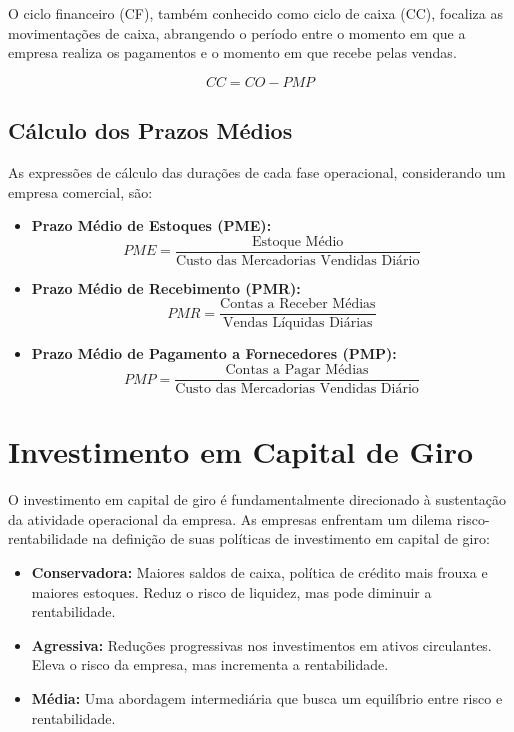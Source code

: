 \documentclass[
  a4paper,
]{book}
\providecommand{\tightlist}{%
  \setlength{\itemsep}{0pt}\setlength{\parskip}{0pt}}\usepackage{longtable,booktabs,array}
\begin{document}
O ciclo financeiro (CF), também conhecido como ciclo de caixa (CC),
focaliza as movimentações de caixa, abrangendo o período entre o momento
em que a empresa realiza os pagamentos e o momento em que recebe pelas
vendas.

\[CC = CO - PMP\]

\subsection{Cálculo dos Prazos
Médios}\label{cuxe1lculo-dos-prazos-muxe9dios}

As expressões de cálculo das durações de cada fase operacional,
considerando um empresa comercial, são:

\begin{itemize}
\tightlist
\item
  \textbf{Prazo Médio de Estoques (PME):}
  \[PME = \frac{\text{Estoque Médio}}{\text{Custo das Mercadorias Vendidas Diário}}\]
\item
  \textbf{Prazo Médio de Recebimento (PMR):}
  \[PMR = \frac{\text{Contas a Receber Médias}}{\text{Vendas Líquidas Diárias}}\]
\item
  \textbf{Prazo Médio de Pagamento a Fornecedores (PMP):}
  \[PMP = \frac{\text{Contas a Pagar Médias}}{\text{Custo das Mercadorias Vendidas Diário}}\]
\end{itemize}

\section{Investimento em Capital de
Giro}\label{investimento-em-capital-de-giro}

O investimento em capital de giro é fundamentalmente direcionado à
sustentação da atividade operacional da empresa. As empresas enfrentam
um dilema risco-rentabilidade na definição de suas políticas de
investimento em capital de giro:

\begin{itemize}
\tightlist
\item
  \textbf{Conservadora:} Maiores saldos de caixa, política de crédito
  mais frouxa e maiores estoques. Reduz o risco de liquidez, mas pode
  diminuir a rentabilidade.
\item
  \textbf{Agressiva:} Reduções progressivas nos investimentos em ativos
  circulantes. Eleva o risco da empresa, mas incrementa a rentabilidade.
\item
  \textbf{Média:} Uma abordagem intermediária que busca um equilíbrio
  entre risco e rentabilidade.
\end{itemize}
\end{document}
